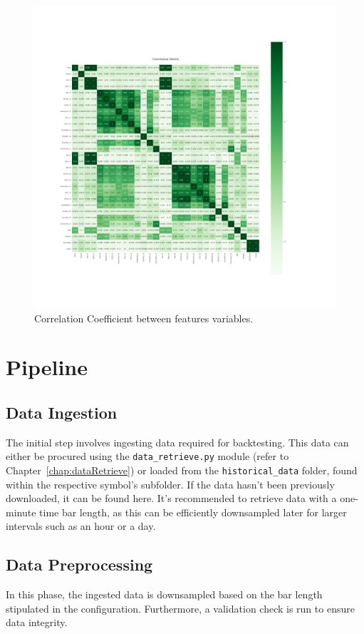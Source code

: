 \begin{figure}[htbp!]
\centering
\includegraphics[width=\paperwidth]{./uml/correlation_matrix.pdf}

\caption{Correlation Coefficient between features variables.}
\label{fig:corr_coef}
\end{figure}


\section{Pipeline}

\subsection{Data Ingestion}
The initial step involves ingesting data required for backtesting. This data can either be procured using the \texttt{data\_retrieve.py} module (refer to Chapter~\ref{chap:dataRetrieve}) or loaded from the \texttt{historical\_data} folder, found within the respective symbol's subfolder. If the data hasn't been previously downloaded, it can be found here. It's recommended to retrieve data with a one-minute time bar length, as this can be efficiently downsampled later for larger intervals such as an hour or a day.

\subsection{Data Preprocessing}
In this phase, the ingested data is downsampled based on the bar length stipulated in the configuration. Furthermore, a validation check is run to ensure data integrity.

